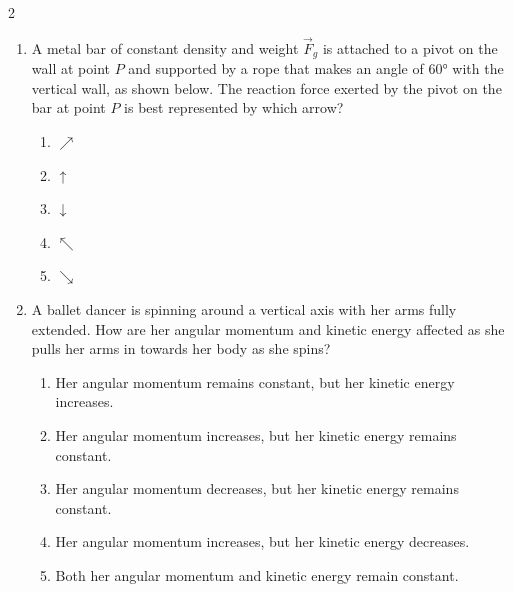 {\begin{multicols}{2}
\begin{enumerate}[leftmargin=12pt,itemsep=6pt]
    \item A metal bar of constant density and weight $\vec F_g$ is attached to a
      pivot on the wall at point $P$ and supported by a rope that makes an angle
      of \ang{60} with the vertical wall, as shown below. The reaction force
      exerted by the pivot on the bar at point $P$ is best represented by which
      arrow?
      \begin{center}
      \end{center}
      \begin{enumerate}
      \item{\Huge$\nearrow$}
      \item{\Huge$\uparrow$}
      \item{\Huge$\downarrow$}
      \item{\Huge$\nwarrow$}
      \item{\Huge$\searrow$}
      \end{enumerate}
      
    \item A ballet dancer is spinning around a vertical axis with her arms fully
      extended. How are her angular momentum and kinetic energy affected as she
      pulls her arms in towards her body as she spins?
      \begin{enumerate}
      \item Her angular momentum remains constant, but her kinetic energy
        increases.
      \item Her angular momentum increases, but her kinetic energy remains
        constant.
      \item Her angular momentum decreases, but her kinetic energy remains
        constant.
      \item Her angular momentum increases, but her kinetic energy decreases.
      \item Both her angular momentum and kinetic energy remain constant.
      \end{enumerate}


\end{enumerate}
\end{multicols}}
